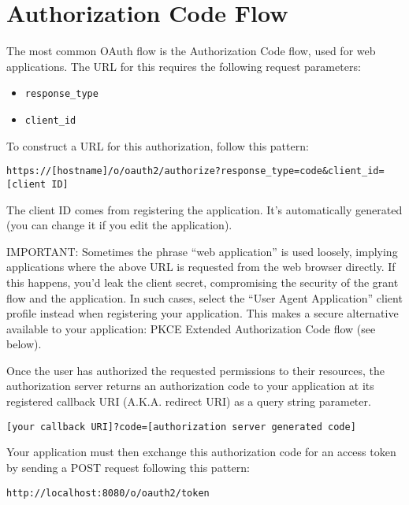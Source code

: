 \section{Authorization Code Flow}\label{authorization-code-flow}

The most common OAuth flow is the Authorization Code flow, used for web
applications. The URL for this requires the following request
parameters:

\begin{itemize}
\tightlist
\item
  \texttt{response\_type}
\item
  \texttt{client\_id}
\end{itemize}

To construct a URL for this authorization, follow this pattern:

\begin{verbatim}
https://[hostname]/o/oauth2/authorize?response_type=code&client_id=[client ID]
\end{verbatim}

The client ID comes from registering the application. It's automatically
generated (you can change it if you edit the application).

IMPORTANT: Sometimes the phrase ``web application'' is used loosely,
implying applications where the above URL is requested from the web
browser directly. If this happens, you'd leak the client secret,
compromising the security of the grant flow and the application. In such
cases, select the ``User Agent Application'' client profile instead when
registering your application. This makes a secure alternative available
to your application: PKCE Extended Authorization Code flow (see below).

Once the user has authorized the requested permissions to their
resources, the authorization server returns an authorization code to
your application at its registered callback URI (A.K.A. redirect URI) as
a query string parameter.

\begin{verbatim}
[your callback URI]?code=[authorization server generated code]
\end{verbatim}

Your application must then exchange this authorization code for an
access token by sending a POST request following this pattern:

\begin{verbatim}
http://localhost:8080/o/oauth2/token
\end{verbatim}

